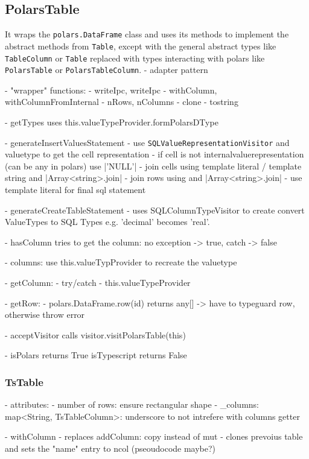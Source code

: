 \subsection{PolarsTable}
It wraps the \Verb|polars.DataFrame| class and uses its methods to implement the abstract methods from \Verb|Table|, except with the general abstract types like \Verb|TableColumn| or \Verb|Table| replaced with types interacting with polars like \Verb|PolarsTable| or \Verb|PolarsTableColumn|.
- adapter pattern

- "wrapper" functions:
- writeIpc, writeIpc
- withColumn, withColumnFromInternal
- nRows, nColumns
- clone
- tostring

- getTypes uses this.valueTypeProvider.formPolarsDType

- generateInsertValuesStatement
- use \Verb|SQLValueRepresentationVisitor| and valuetype to get the cell representation
- if cell is not internalvaluerepresentation (can be any in polars) use |'NULL'|
- join cells using template literal / template string and |Array<string>.join|
- join rows using and |Array<string>.join|
- use template literal for final sql statement

- generateCreateTableStatement
- uses SQLColumnTypeVisitor to create convert ValueTypes to SQL Types e.g. 'decimal' becomes 'real'.

- hasColumn tries to get the column: no exception -> true, catch -> false

- columns: use this.valueTypProvider to recreate the valuetype

- getColumn:
- try/catch
- this.valueTypeProvider

- getRow:
- polars.DataFrame.row(id) returns any[] -> have to typeguard row, otherwise throw error

- acceptVisitor calls visitor.visitPolarsTable(this)

- isPolars returns True isTypescript returns False

\subsubsection{TsTable}
- attributes:
- number of rows: ensure rectangular shape
- _columns: map<String, TsTableColumn>: underscore to not intrefere with columns getter

- withColumn
- replaces addColumn: copy instead of mut
- clones prevoius table and sets the "name" entry to ncol (pseoudocode maybe?)

